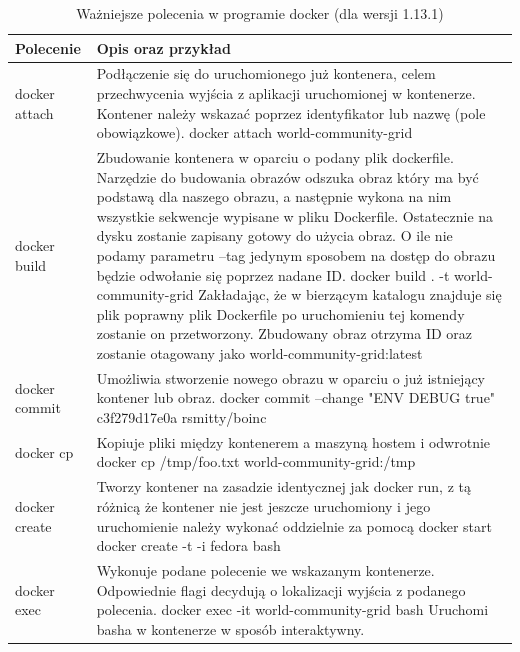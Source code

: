 \documentclass[10pt,a4paper,titlepage,twoside]{report}
\begin{document}
\begin{table}[!htbp]
\caption{Ważniejsze polecenia w programie docker (dla wersji 1.13.1)}
\label{docker_cli}
\begin{tabular}{|p{3cm}|p{11cm}|}
  \hline
  \textbf{Polecenie} & \textbf{Opis oraz przykład}\\
  \hline
  docker attach & Podłączenie się do uruchomionego już kontenera, celem przechwycenia wyjścia z aplikacji uruchomionej w kontenerze. Kontener należy wskazać poprzez identyfikator lub nazwę (pole obowiązkowe). \newline docker attach world-community-grid \\
  \hline
  docker build & Zbudowanie kontenera w oparciu o podany plik dockerfile. Narzędzie do budowania obrazów odszuka obraz który ma być podstawą dla naszego obrazu, a następnie wykona na nim wszystkie sekwencje wypisane w pliku Dockerfile. Ostatecznie na dysku zostanie zapisany gotowy do użycia obraz. O ile nie podamy parametru –tag jedynym sposobem na dostęp do obrazu będzie odwołanie się poprzez nadane ID.
  \newline docker build . -t  world-community-grid \newline Zakładając, że w bierzącym katalogu znajduje się plik poprawny plik Dockerfile po uruchomieniu tej komendy zostanie on przetworzony. Zbudowany obraz otrzyma ID oraz zostanie otagowany jako  world-community-grid:latest \\
  \hline
  docker commit & Umożliwia stworzenie nowego obrazu w oparciu o już istniejący kontener lub obraz. \newline docker commit --change "ENV DEBUG true" c3f279d17e0a rsmitty/boinc \\
  \hline
  docker cp & Kopiuje pliki między kontenerem a maszyną hostem i odwrotnie \newline docker cp /tmp/foo.txt world-community-grid:/tmp \\
  \hline
  docker create & Tworzy kontener na zasadzie identycznej jak docker run, z tą różnicą że kontener nie jest jeszcze uruchomiony i jego uruchomienie należy wykonać oddzielnie za pomocą docker start \newline docker create -t -i fedora bash \\
  \hline
  docker exec & Wykonuje podane polecenie we wskazanym kontenerze. Odpowiednie flagi decydują o lokalizacji wyjścia z podanego polecenia. \newline docker exec -it  world-community-grid bash \newline Uruchomi basha w kontenerze w sposób interaktywny. \\

\end{tabular}
\end{table}
\end{document}
